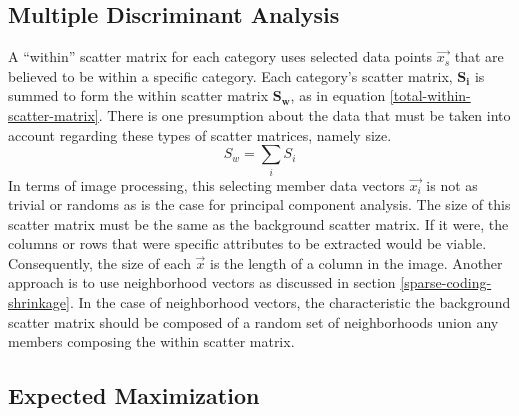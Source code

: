 \documentclass[11pt]{article}
\begin{document}
%





\subsection{Multiple Discriminant Analysis}
\label{mda-description-subsection}
A ``within'' scatter matrix for each category uses selected data points $\vec{x_s}$  that are believed to be within a specific category.  Each category's scatter matrix, $\mathbf{S_i}$ is summed to form the within scatter matrix $\mathbf{S_w}$, as in equation \ref{total-within-scatter-matrix}.  There is one presumption about the data that must be taken into account regarding these types of scatter matrices, namely size. 
\begin{equation}
	S_w = \sum_i S_i \label{total-within-scatter-matrix}
\end{equation}
In terms of image processing, this selecting member data vectors $\vec{x_i}$ %
is not as trivial or randoms as is the case for principal component analysis.  The size of this scatter matrix must %
be the same as the background scatter matrix.  If it were, the columns or rows that were specific attributes to be extracted would be viable.  Consequently, the size of each $\vec{x}$ is the length of a column in the image.  Another approach is to use neighborhood vectors as discussed in section \ref{sparse-coding-shrinkage}.  In the case of neighborhood vectors, the characteristic the background scatter matrix should be composed of a random set of neighborhoods union any members composing the within scatter matrix.  

\subsection{Expected Maximization}\label{em-description-subsection}
\end{document}
